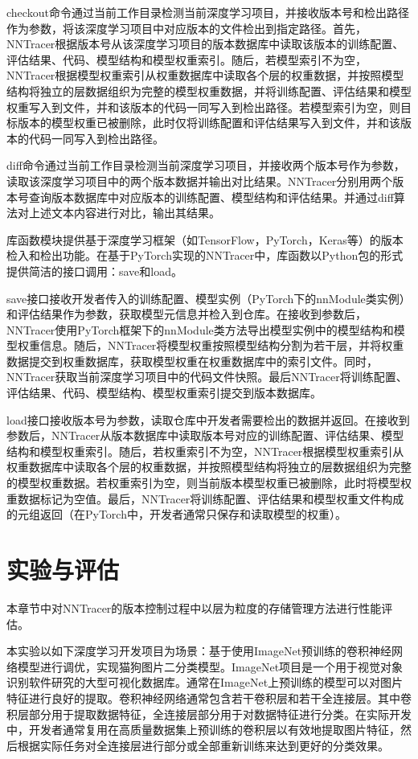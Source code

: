 \documentclass{cjc}
\begin{document}
checkout命令通过当前工作目录检测当前深度学习项目，并接收版本号和检出路径作为参数，将该深度学习项目中对应版本的文件检出到指定路径。首先，NNTracer根据版本号从该深度学习项目的版本数据库中读取该版本的训练配置、评估结果、代码、模型结构和模型权重索引。随后，若模型索引不为空，NNTracer根据模型权重索引从权重数据库中读取各个层的权重数据，并按照模型结构将独立的层数据组织为完整的模型权重数据，并将训练配置、评估结果和模型权重写入到文件，并和该版本的代码一同写入到检出路径。若模型索引为空，则目标版本的模型权重已被删除，此时仅将训练配置和评估结果写入到文件，并和该版本的代码一同写入到检出路径。

diff命令通过当前工作目录检测当前深度学习项目，并接收两个版本号作为参数，读取该深度学习项目中的两个版本数据并输出对比结果。NNTracer分别用两个版本号查询版本数据库中对应版本的训练配置、模型结构和评估结果。并通过diff算法对上述文本内容进行对比，输出其结果。

库函数模块提供基于深度学习框架（如TensorFlow，PyTorch，Keras等）的版本检入和检出功能。在基于PyTorch实现的NNTracer中，库函数以Python包的形式提供简洁的接口调用：save和load。

save接口接收开发者传入的训练配置、模型实例（PyTorch下的nnModule类实例）和评估结果作为参数，获取模型元信息并检入到仓库。在接收到参数后，NNTracer使用PyTorch框架下的nnModule类方法导出模型实例中的模型结构和模型权重信息。随后，NNTracer将模型权重按照模型结构分割为若干层，并将权重数据提交到权重数据库，获取模型权重在权重数据库中的索引文件。同时，NNTracer获取当前深度学习项目中的代码文件快照。最后NNTracer将训练配置、评估结果、代码、模型结构、模型权重索引提交到版本数据库。

load接口接收版本号为参数，读取仓库中开发者需要检出的数据并返回。在接收到参数后，NNTracer从版本数据库中读取版本号对应的训练配置、评估结果、模型结构和模型权重索引。随后，若权重索引不为空，NNTracer根据模型权重索引从权重数据库中读取各个层的权重数据，并按照模型结构将独立的层数据组织为完整的模型权重数据。若权重索引为空，则当前版本模型权重已被删除，此时将模型权重数据标记为空值。最后，NNTracer将训练配置、评估结果和模型权重文件构成的元组返回（在PyTorch中，开发者通常只保存和读取模型的权重）。

\section{实验与评估}

本章节中对NNTracer的版本控制过程中以层为粒度的存储管理方法进行性能评估。

本实验以如下深度学习开发项目为场景：基于使用ImageNet预训练的卷积神经网络模型进行调优，实现猫狗图片二分类模型。ImageNet项目是一个用于视觉对象识别软件研究的大型可视化数据库。通常在ImageNet上预训练的模型可以对图片特征进行良好的提取。卷积神经网络通常包含若干卷积层和若干全连接层。其中卷积层部分用于提取数据特征，全连接层部分用于对数据特征进行分类。在实际开发中，开发者通常复用在高质量数据集上预训练的卷积层以有效地提取图片特征，然后根据实际任务对全连接层进行部分或全部重新训练来达到更好的分类效果。
\end{document}
